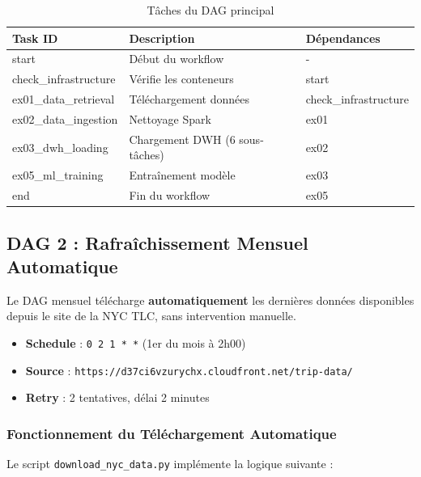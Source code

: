 \documentclass[12pt,a4paper]{report}
\begin{document}
\begin{table}[H]
\centering
\caption{Tâches du DAG principal}
\begin{tabular}{@{}lll@{}}
\toprule
\textbf{Task ID} & \textbf{Description} & \textbf{Dépendances} \\
\midrule
start & Début du workflow & - \\
check\_infrastructure & Vérifie les conteneurs & start \\
ex01\_data\_retrieval & Téléchargement données & check\_infrastructure \\
ex02\_data\_ingestion & Nettoyage Spark & ex01 \\
ex03\_dwh\_loading & Chargement DWH (6 sous-tâches) & ex02 \\
ex05\_ml\_training & Entraînement modèle & ex03 \\
end & Fin du workflow & ex05 \\
\bottomrule
\end{tabular}
\end{table}

\subsection{DAG 2 : Rafraîchissement Mensuel Automatique}

Le DAG mensuel télécharge \textbf{automatiquement} les dernières données disponibles depuis le site de la NYC TLC, sans intervention manuelle.

\begin{itemize}
    \item \textbf{Schedule} : \texttt{0 2 1 * *} (1er du mois à 2h00)
    \item \textbf{Source} : \texttt{https://d37ci6vzurychx.cloudfront.net/trip-data/}
    \item \textbf{Retry} : 2 tentatives, délai 2 minutes
\end{itemize}

\subsubsection{Fonctionnement du Téléchargement Automatique}

Le script \texttt{download\_nyc\_data.py} implémente la logique suivante :
\end{document}
